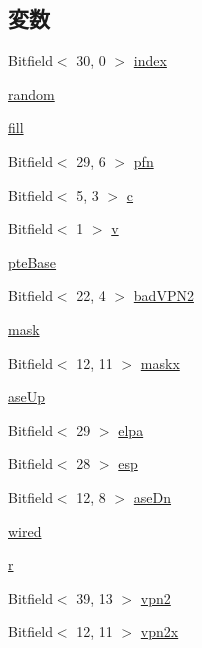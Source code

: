 \subsection*{変数}
\begin{DoxyCompactItemize}
\item 
Bitfield$<$ 30, 0 $>$ \hyperlink{namespaceMipsISA_ae6714ce3c5ef82205cecbd410556edf3}{index}
\item 
\hyperlink{namespaceMipsISA_a56a0acddcb737a80ddd5a0ffcfeaedae}{random}
\item 
\hyperlink{namespaceMipsISA_a95b18420f1d84cd2e568f274679db425}{fill}
\item 
Bitfield$<$ 29, 6 $>$ \hyperlink{namespaceMipsISA_a2c862acc14629b827b48b1b59da7f12a}{pfn}
\item 
Bitfield$<$ 5, 3 $>$ \hyperlink{namespaceMipsISA_a9870e0f31b895bc27b12e0f5caf3be8e}{c}
\item 
Bitfield$<$ 1 $>$ \hyperlink{namespaceMipsISA_a4814b685763016f32ad4e56d38a18b5b}{v}
\item 
\hyperlink{namespaceMipsISA_a76e747c3358cf8d63fc2cf8c70c2bfe2}{pteBase}
\item 
Bitfield$<$ 22, 4 $>$ \hyperlink{namespaceMipsISA_a84d68422a6a80ba6a315851f269851be}{badVPN2}
\item 
\hyperlink{namespaceMipsISA_a6d232ec92c51be65510dfa67e967ff39}{mask}
\item 
Bitfield$<$ 12, 11 $>$ \hyperlink{namespaceMipsISA_ab8afb5673e4f9abd09809ffba0490507}{maskx}
\item 
\hyperlink{namespaceMipsISA_aa5acdfbefb13ec6993b9d39c1f22ecb0}{aseUp}
\item 
Bitfield$<$ 29 $>$ \hyperlink{namespaceMipsISA_a8471075f47ba695c3ad38757bb590b90}{elpa}
\item 
Bitfield$<$ 28 $>$ \hyperlink{namespaceMipsISA_aa4c67885018da99384ffc72ac56cae3b}{esp}
\item 
Bitfield$<$ 12, 8 $>$ \hyperlink{namespaceMipsISA_a4c7f9eb0c1fa6cec7058e1a82a1f24c1}{aseDn}
\item 
\hyperlink{namespaceMipsISA_a54e2304bd916a94b53849759e1e29625}{wired}
\item 
\hyperlink{namespaceMipsISA_a7de4997f814ef7d6392df74a7a1c5e0d}{r}
\item 
Bitfield$<$ 39, 13 $>$ \hyperlink{namespaceMipsISA_adba8f5c87b20c4fa1b6e1e69bc3a5c38}{vpn2}
\item 
Bitfield$<$ 12, 11 $>$ \hyperlink{namespaceMipsISA_ae5ee50853536d9e785e37c6c6073abfd}{vpn2x}
\item 

\end{DoxyCompactItemize}
